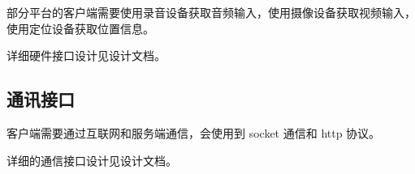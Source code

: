 部分平台的客户端需要使用录音设备获取音频输入，使用摄像设备获取视频输入，使用定位设备获取位置信息。

详细硬件接口设计见设计文档。

\subsection{通讯接口}
% 
% 
% 

客户端需要通过互联网和服务端通信，会使用到 socket 通信和 http 协议。

详细的通信接口设计见设计文档。